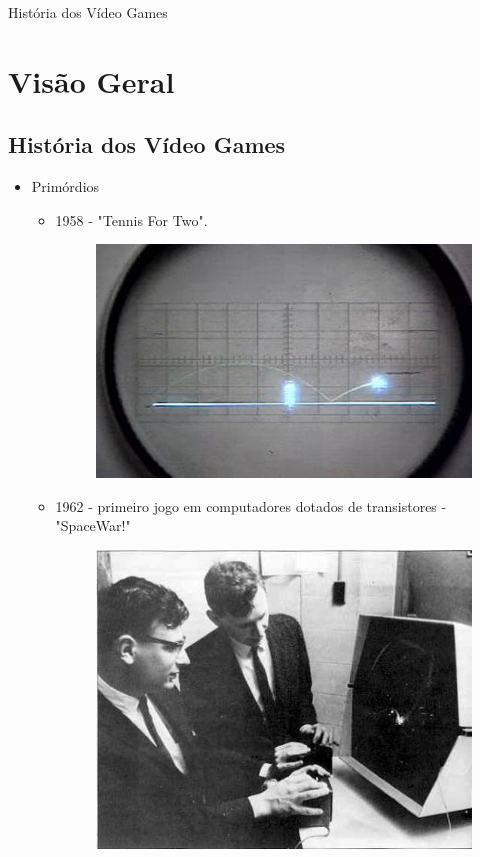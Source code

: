 \documentclass[xcolor=svgnames,handout]{beamer}
\begin{document}
\begin{frame}{História dos Vídeo Games}
\section{Visão Geral}
\subsection{História dos Vídeo Games}
\begin{itemize}
	\item Primórdios
	\begin{itemize}
		\item 1958 - "Tennis For Two".\pause
		\begin{figure}[t]
		    \centering
		    \includegraphics[scale=0.07]{imagens/tennis-for-two}
		  \end{figure}\pause
		\item 1962 - primeiro jogo em computadores dotados de transistores - "SpaceWar!"\pause
				\begin{figure}[t]
				    \centering
				    \includegraphics[scale=0.2]{imagens/golden_age3}
				  \end{figure}\pause
	\end{itemize}
\end{itemize}

\end{frame}
\end{document}
